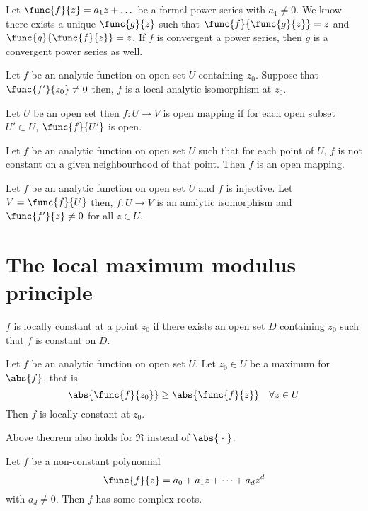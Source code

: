 \begin{theorem}
    Let \(\func{f}{z} = a_1z + \dots \) be a formal power series with \(a_1 \neq 0\). We know there exists a unique \(\func{g}{z}\) such that \(\func{f}{\func{g}{z}} = z\) and \(\func{g}{\func{f}{z}} = z\). If \(f\) is convergent a power series, then \(g\) is a convergent power series as well. 
\end{theorem}

\begin{theorem}
    Let \(f\) be an analytic function on open set \(U\) containing \(z_0\). Suppose that \(\func{f'}{z_0} \neq 0\) then, \(f\) is a local analytic isomorphism at \(z_0\).
\end{theorem}

\begin{definition}
    Let \(U\) be an open set then \(f : U \to V\) is open mapping if for each open subset \(U' \subset U\), \(\func{f}{U'}\) is open.
\end{definition}

\begin{theorem}
    Let \(f\) be an analytic function on open set \(U\) such that for each point of \(U\), \(f\) is not constant on a given neighbourhood of that point. Then \(f\) is an open mapping.
\end{theorem}

\begin{theorem}
    Let \(f\) be an analytic function on open set \(U\) and \(f\) is injective. Let \(V = \func{f}{U}\) then, \(f : U \to V\) is an analytic isomorphism and \(\func{f'}{z} \neq 0\) for all \(z \in U\).
\end{theorem}

\section{The local maximum modulus principle}
\begin{definition}
    \(f\) is locally constant at a point \(z_0\) if there exists an open set \(D\) containing \(z_0\) such that \(f\) is constant on \(D\).
\end{definition}

\begin{theorem}
    Let \(f\) be an analytic function on open set \(U\). Let \(z_0 \in U\) be a maximum for \(\abs{f}\), that is 
    \begin{equation*}
        \abs{\func{f}{z_0}} \geq \abs{\func{f}{z}} \quad \forall z \in U
    \end{equation*}
    Then \(f\) is locally constant at \(z_0\).
\end{theorem}

\begin{corollary}
    Above theorem also holds for \(\Re\) instead of \(\abs{\; \cdot \;}\).
\end{corollary}

\begin{theorem}
    Let \(f\) be a non-constant polynomial 
    \begin{equation*}
        \func{f}{z} = a_0 + a_1 z + \dots + a_d z^d
    \end{equation*}
    with \(a_d \neq 0\). Then \(f\) has some complex roots. 
\end{theorem}